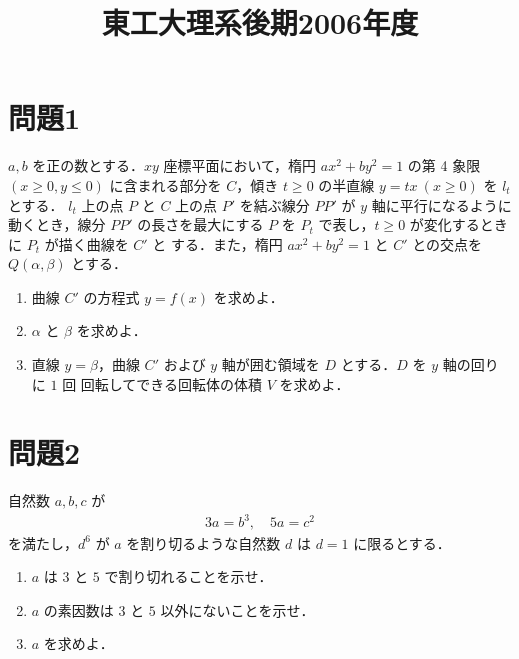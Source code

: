 \documentclass[unicode,12pt, a4paper]{ltjsarticle}%
\title{東工大理系後期2006年度}
\begin{document}
\maketitle
\section{問題1}
$a, b$ を正の数とする．$xy$ 座標平面において，楕円 $ax^2 + by^2 = 1$ の第 4 象限
$(x \ge 0, y \le 0)$ に含まれる部分を $C$，傾き $t \ge 0$ の半直線 $y = tx \ (x \ge 0)$ を $l_t$ とする．
$l_t$ 上の点 $P$ と $C$ 上の点 $P'$ を結ぶ線分 $PP'$ が $y$ 軸に平行になるように動くとき，線分
$PP'$ の長さを最大にする $P$ を $P_t$ で表し，$t \ge 0$ が変化するときに $P_t$ が描く曲線を $C'$ と
する．また，楕円 $ax^2 + by^2 = 1$ と $C'$ との交点を $Q(\alpha, \beta)$ とする．

\begin{enumerate}
    \item 曲線 $C'$ の方程式 $y = f(x)$ を求めよ．
    \item $\alpha$ と $\beta$ を求めよ．
    \item 直線 $y = \beta$，曲線 $C'$ および $y$ 軸が囲む領域を $D$ とする．$D$ を $y$ 軸の回りに $1$ 回
    回転してできる回転体の体積 $V$ を求めよ．
\end{enumerate}


\section{問題2}
自然数 $a, b, c$ が
\begin{align*}
3a = b^3, \quad 5a = c^2
\end{align*}
を満たし，$d^6$ が $a$ を割り切るような自然数 $d$ は $d=1$ に限るとする．

\begin{enumerate}
    \item $a$ は $3$ と $5$ で割り切れることを示せ．
    \item $a$ の素因数は $3$ と $5$ 以外にないことを示せ．
    \item $a$ を求めよ．
\end{enumerate}
\end{document}
